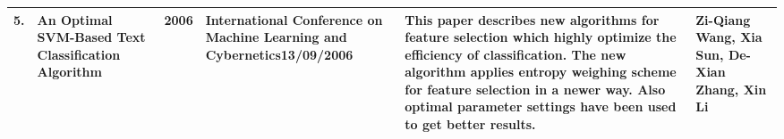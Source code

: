 \documentclass{beamer}
\begin{document}
\begin{frame}[t, allowframebreaks]
\begin{longtable}{|p{0.28cm}|p{1.8cm}|p{0.3cm}|p{1.8cm}|p{3.5cm}|p{1.3cm}|}
5.\rule{0pt}{3ex}              & An Optimal SVM-Based Text Classification Algorithm \cite{wang2006optimal}                             & 2006          & International Conference on Machine Learning and Cybernetics13/09/2006                                        & This paper describes new algorithms for feature selection which highly optimize the efficiency of classification. The new algorithm applies entropy weighing scheme for feature selection in a newer way. Also optimal parameter settings have been used to get better results.                                                                                     & Zi-Qiang Wang, Xia Sun, De-Xian Zhang, Xin Li         \\ \hline
\end{longtable}
\end{frame}
\end{document}
